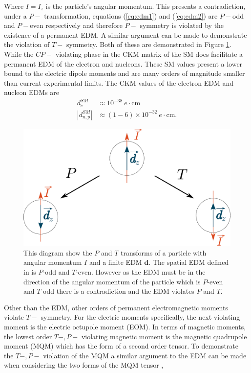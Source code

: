 \documentclass[10pt,a4paper, twoside, openright]{report}
\begin{document}
Where $I = I_z$ is the particle's angular momentum. This presents a contradiction, under a  $P-$  transformation, equations (\ref{eq:edm1}) and (\ref{eq:edm2}) are $P-$odd and $P-$even respectively and therefore $P-$ symmetry is violated by the existence of a permanent EDM. A similar argument can be made to demonstrate the violation of $T-$ symmetry. Both of these are demonstrated in Figure \ref{fig:ParityTimeEDM}. While the $CP-$ violating phase in the CKM matrix of the SM does facilitate a permanent EDM of the electron and nucleons. These SM values present a lower bound to the electric dipole moments and are many orders of magnitude smaller than current experimental limits. The CKM values of the electron EDM\cite{Ng1996} and nucleon EDMs \cite{Seng2015} are
\begin{align}
d_{e}^{SM} &\approx 10^{-38} \ e\cdot\text{cm} \\
|d_{n,p}^{SM}| &\approx (1-6) \times 10^{-32} \ e\cdot\text{cm}.
\end{align} 
\begin{figure}
\includegraphics[scale=0.3]{./figures/EDM.eps}
\caption[Parity and time reversal transforms of a permanent EDM]{\label{fig:ParityTimeEDM} This diagram show the $P$ and $T$ transforms of a particle with angular momentum $I$ and a finite EDM $\textbf{d}$. The spatial EDM defined in  is $P$-odd and $T$-even. However as the EDM must be in the direction of the angular momentum of the particle which is $P$-even and $T$-odd there is a contradiction and the EDM violates $P$ and $T$.}
\end{figure}
Other than the EDM, other orders of permanent electromagnetic moments violate $T-$ symmetry. For the electric moments specifically, the next violating moment is the electric octupole moment (EOM). In terms of magnetic moments, the lowest order $T-,P-$ violating magnetic moment is the magnetic quadrupole moment (MQM) which has the form of a second order tensor. To demonstrate the $T-,P-$ violation of the MQM a similar argument to the EDM can be made when considering the two forms of the MQM tensor \cite{SFK1984},
\end{document}
